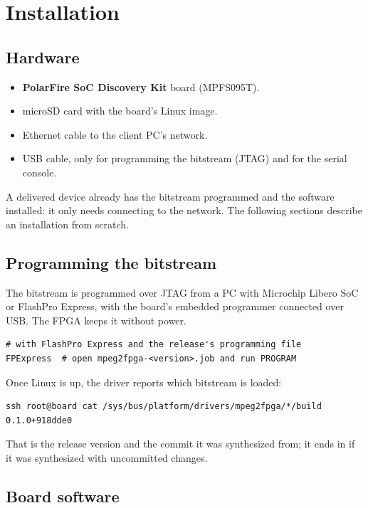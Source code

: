 \chapter{Installation}

\section{Hardware}

\begin{itemize}
  \item \textbf{PolarFire SoC Discovery Kit} board (MPFS095T).
  \item microSD card with the board's Linux image.
  \item Ethernet cable to the client PC's network.
  \item USB cable, only for programming the bitstream (JTAG) and for the
    serial console.
\end{itemize}

A delivered device already has the bitstream programmed and the software
installed: it only needs connecting to the network. The following sections
describe an installation from scratch.

\section{Programming the bitstream}

The bitstream is programmed over JTAG from a PC with Microchip Libero SoC or
FlashPro Express, with the board's embedded programmer connected over USB. The
FPGA keeps it without power.

\begin{lstlisting}[language=shell]
# with FlashPro Express and the release's programming file
FPExpress  # open mpeg2fpga-<version>.job and run PROGRAM
\end{lstlisting}

Once Linux is up, the driver reports which bitstream is loaded:

\begin{lstlisting}[language=shell]
ssh root@board cat /sys/bus/platform/drivers/mpeg2fpga/*/build
0.1.0+918dde0
\end{lstlisting}

That is the release version and the commit it was synthesized from; it ends
in  if it was synthesized with uncommitted changes.

\section{Board software}

